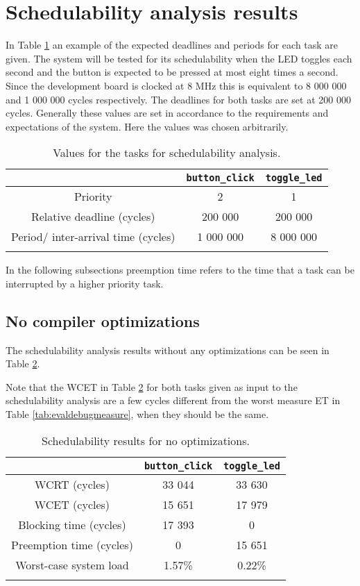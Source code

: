 \section{Schedulability analysis results}
In Table \ref{tab:evalschedtasks} an example of the expected deadlines and
periods for each task are given. The system will be tested for its
schedulability when the LED toggles each second and the button is expected to
be pressed at most eight times a second. Since the development board is clocked
at 8 MHz this is equivalent to 8 000 000 and 1 000 000 cycles respectively. The
deadlines for both tasks are set at 200 000 cycles. Generally these values are set
in accordance to the requirements and expectations of the system. Here the values
was chosen arbitrarily.

\begin{longtable}{|c | c | c|}
    \hline
     & \texttt{button\_click} & \texttt{toggle\_led} \\
    \hline
    Priority & 2 & 1 \\
    \hline
    Relative deadline (cycles) & 200 000 & 200 000 \\
    \hline
    Period/ inter-arrival time (cycles) & 1 000 000 & 8 000 000 \\
    \hline
\caption{Values for the tasks for schedulability analysis.}
\label{tab:evalschedtasks}
\end{longtable}

In the following subsections preemption time refers to the time that
a task can be interrupted by a higher priority task.

\subsection{No compiler optimizations}
The schedulability analysis results without any optimizations can be seen in
Table \ref{tab:evalscheddebug}.

Note that the WCET in Table \ref{tab:evalscheddebug} for both tasks given as input
to the schedulability analysis are a few cycles different from the worst measure
ET in Table \ref{tab:evaldebugmeasure}, when they should be the same.

\begin{longtable}{|c | c | c|}
    \hline
     & \texttt{button\_click} & \texttt{toggle\_led} \\
    \hline
    WCRT (cycles) & 33 044 & 33 630 \\
    \hline
    WCET (cycles) & 15 651 & 17 979 \\
    \hline
    Blocking time (cycles) & 17 393 & 0 \\
    \hline
    Preemption time (cycles) & 0 & 15 651 \\
    \hline
    Worst-case system load & 1.57\% & 0.22\% \\
    \hline
\caption{Schedulability results for no optimizations.}
\label{tab:evalscheddebug}
\end{longtable}

